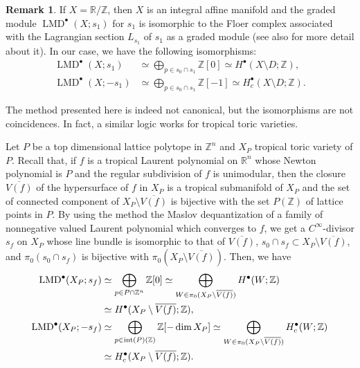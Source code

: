 \documentclass[a4paper,dvipdfmx,reqno,12pt]{amsart}
\theoremstyle{definition}
\newtheorem{remark}[theorem]{Remark}
\newcommand{\opn}[1]{\operatorname{#1}}
\numberwithin{equation}{section}
\begin{document}
\begin{remark}
If $X=\mathbb{R}/\mathbb{Z}$, then 
$X$ is an integral affine manifold and  
the graded module $\opn{LMD}^{\bullet}(X;s_{1})$
for $s_{1}$ is isomorphic to the Floer complex
associated with the Lagrangian section $L_{s_{1}}$
of $s_{1}$ \cite[Remark 13]{MR1882331} as a graded
module (see also \cite[]{tsutsui2023graded}
for more detail about it). In our case, we have 
the following isomorphisms:
\begin{align}
\opn{LMD}^{\bullet}(X;s_{1}) &\simeq 
\bigoplus_{p\in s_0\cap s_{1}}\mathbb{Z}[0]
\simeq H^{\bullet}(X\setminus D;\mathbb{Z}), \\
\opn{LMD}^{\bullet}(X;-s_{1}) &\simeq
\bigoplus_{p\in s_0\cap s_{1}}\mathbb{Z}[-1]
\simeq H^{\bullet}_c(X\setminus D;\mathbb{Z}).
\end{align}




The method presented here is indeed not canonical,
but the isomorphisms are not coincidences. In fact, 
a similar logic works for tropical toric varieties.


Let $P$ be a top dimensional lattice polytope
in $\mathbb{Z}^{n}$ and $X_P$ tropical toric variety
of $P$. Recall that,
if $f$ is a tropical Laurent polynomial on 
$\mathbb{R}^{n}$ 
whose Newton polynomial is $P$ and the regular
subdivision of $f$ is unimodular, then the closure
$\overline{V(f)}$ of
the hypersurface of $f$ in $X_P$ is a tropical submanifold
of $X_P$ and the set of connected component of 
$X_P\setminus \overline{V(f)}$ is bijective with the set $P(\mathbb{Z})$
of lattice points in $P$.
By using the method the Maslov dequantization 
of a family of nonnegative valued Laurent polynomial
which converges to $f$, we get a 
$C^{\infty}$-divisor $s_f$ on $X_P$ whose line bundle is
isomorphic to that of $\overline{V(f)}$, 
$s_0\cap s_{f}\subset X_P\setminus \overline{V(f)}$,
and $\pi_0(s_0\cap s_{f})$ is bijective with 
$\pi_0(X_P\setminus \overline{V(f)})$.
Then, we have
\begin{align}
\opn{LMD}^{\bullet}(X_P;s_{f})
&\simeq \bigoplus_{p\in P\cap \mathbb{Z}^{n}}\mathbb{Z}[0]
\simeq \bigoplus_{W\in \pi_0(X_P\setminus \overline{V(f)})}
H^{\bullet}(W;\mathbb{Z}) \notag \\
&\simeq H^{\bullet}(X_P\setminus \overline{V(f)};\mathbb{Z}), \\
\opn{LMD}^{\bullet}(X_P;-s_{f})
&\simeq \bigoplus_{p\in \opn{int}(P)(\mathbb{Z})}
\mathbb{Z}[-\dim X_P]
\simeq \bigoplus_{W\in \pi_0(X_P\setminus \overline{V(f)})}
H^{\bullet}_c(W;\mathbb{Z}) \notag \\
&\simeq H^{\bullet}_c(X_P\setminus \overline{V(f)};\mathbb{Z}).
\end{align}


\end{remark}
\end{document}
